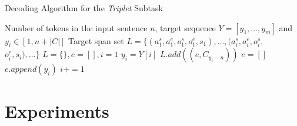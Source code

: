 \documentclass[11pt,a4paper]{article}
\begin{document}
\begin{algorithm}[ht]
  \begin{algorithmic}[1]
    \caption{Decoding Algorithm for the \emph{Triplet} Subtask} \label{al1}
    \Require Number of tokens in the input sentence $n$, target sequence $Y=[y_1, ..., y_m]$ and $y_i \in [1, n+|C|]$
    \Ensure  Target span set $L=\{(a_1^s, a_1^e, o_1^s, o_1^e, s_1), ..., (a_i^s, a_i^e, o_i^s, $ $o_i^e, s_i), ...\}$
    \State $L=\{\}, e=[], i=1$
      \State $y_i = Y[i]$
      \State  $L.add((e, C_{y_i-n}))$
      \State $e=[]$
      \Else
      \State $e.append(y_i)$
      \EndIf
      \State $i+=1$
    \EndWhile
    \State {}
  \end{algorithmic}
\end{algorithm}


\section{Experiments}
\end{document}
